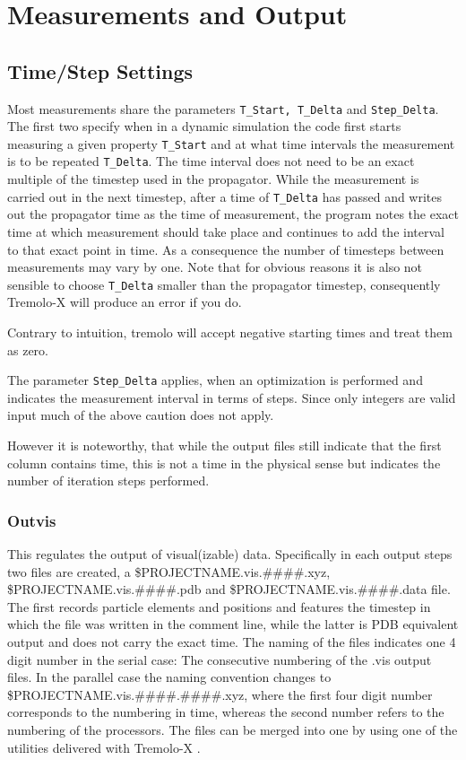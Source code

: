 \chapter{Measurements and Output}
\label{measurement}
\section{Time/Step Settings}
\label{measuresetting}
Most measurements share the parameters
{\tt T\_Start,   T\_Delta} and {\tt Step\_Delta}.
The first two specify when in a dynamic simulation the code first starts measuring a given property {\tt T\_Start} 
and at what time intervals the measurement is to be repeated  {\tt T\_Delta}.
The time interval does not need to be an exact multiple of the timestep used in the propagator. 
While the measurement is carried out in the next timestep, after a time of {\tt T\_Delta}
has passed and writes out the propagator time as the time of measurement, 
the program notes the exact time at which measurement should take place and 
continues to add the interval to that exact point in time. 
As a consequence the number of timesteps between measurements may vary by one. 
Note that for obvious reasons it is also not sensible to choose {\tt T\_Delta} smaller
than the propagator timestep, consequently Tremolo-X will produce an error if you do.

Contrary to intuition, tremolo will accept negative starting times and treat them as zero.

The parameter {\tt Step\_Delta} applies, when an optimization is performed and indicates the measurement interval
in terms of steps. Since only integers are valid input much of the above caution does not apply.

However it is noteworthy, that while the output files still indicate that the first column contains time, this is not a time in the physical sense
but indicates the number of iteration steps performed.

\subsection{Outvis}
This regulates the output of visual(izable) data. Specifically in each output steps two files are created, a \$PROJECTNAME.vis.\#\#\#\#.xyz, \$PROJECTNAME.vis.\#\#\#\#.pdb and \$PROJECTNAME.vis.\#\#\#\#.data file. 
The first records particle elements and positions and features the timestep in which the file was written in the comment line, while the latter is PDB equivalent output 
and does not carry the exact time.
The naming of the files indicates one 4 digit number in the serial case: The consecutive numbering of the .vis output files.
In the parallel case the naming convention changes to \$PROJECTNAME.vis.\#\#\#\#.\#\#\#\#.xyz, where the first four digit number corresponds to the numbering in time,
whereas the second number refers to the numbering of the processors. The files can be merged into one by using one of the utilities delivered with Tremolo-X .

